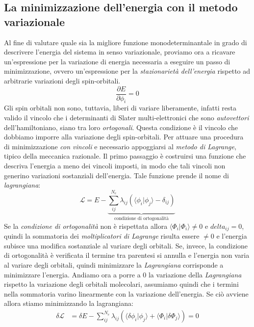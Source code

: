 \documentclass[oneside]{amsbook}
\numberwithin{section}{chapter}
\numberwithin{equation}{section}
\numberwithin{figure}{section}
\begin{document}
 \subsection{La minimizzazione dell'energia con il metodo variazionale}
 Al fine di valutare quale sia la migliore funzione monodeterminantale in grado di descrivere l'energia del sistema in senso variazionale, proviamo ora a ricavare un'espressione per la variazione di energia necessaria a eseguire un passo di minimizzazione, ovvero un'espressione per la \emph{stazionarietà dell'energia } rispetto ad arbitrarie variazioni degli spin-orbitali.
 \begin{equation}
 \frac{\partial E}{\partial \phi_i}=0
 \end{equation}
Gli spin orbitali non sono, tuttavia, liberi di variare liberamente, infatti resta valido il vincolo che i determinanti di Slater multi-elettronici che sono \emph{autovettori} dell'hamiltoniano, siano tra loro \emph{ortogonali}. Questa condizione è il vincolo che dobbiamo imporre alla variazione degli spin-orbitali. Per attuare una procedura di minimizzazione \emph{con vincoli} e necessario appoggiarsi al \emph{metodo di Lagrange}, tipico della meccanica razionale.
Il primo passaggio è costruirsi una funzione che descriva l'energia a meno dei vincoli imposti, in modo che tali vincoli non generino variazioni sostanziali dell'energia. Tale funzione prende il nome di \emph{lagrangiana}:
\begin{equation}
\mathcal{L}=E-\underbrace{\sum \limits _{ij} ^{N_e}\lambda _{ij} (\langle\phi_i\vert\phi_j\rangle-\delta_{ij})}_{\text{condizione di ortogonalità}}
\end{equation}
Se la \emph{condizione di ortogonalità} non è rispettata allora $\langle\Phi_i\vert\Phi_i\rangle\neq0$ e $delta_{ij}=0$, quindi la sommatoria dei \emph{moltiplicatori di Lagrange} risulta essere $\neq 0$ e l'energia subisce una modifica sostanziale al variare degli orbitali.
Se, invece, la condizione di ortogonalità è verificata il termine tra parentesi si annulla e l'energia non varia al variare degli orbitali, quindi minimizzare la \emph{Lagrangiana} corrisponde a minimizzare l'energia.
Andiamo ora a porre a $0$ la variazione della \emph{Lagrangiana} rispetto la variazione degli orbitali molecolari, assumiamo quindi che i termini nella sommatoria varino linearmente con la variazione dell'energia. Se ciò avviene allora stiamo minimizzando la lagrangiana:
\begin{equation}
\label{diofa}
\begin{aligned}
 \delta\mathcal{L}&= \delta E-\sum \limits _{ij} ^{N_e}\lambda _{ij} (\langle \delta \phi_i\vert\phi_j\rangle+\langle\Phi_i\vert\delta\Phi_j\rangle)=0
\end{aligned}
\end{equation}
\end{document}
